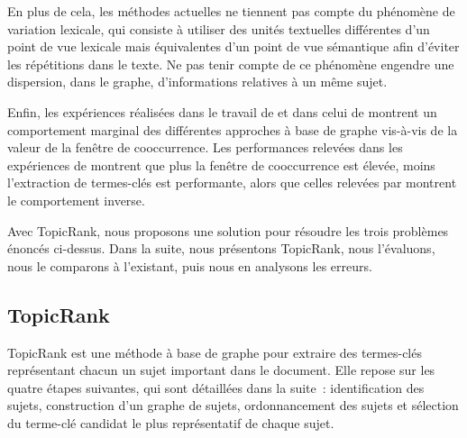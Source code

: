     En plus de cela, les méthodes actuelles ne tiennent pas compte du phénomène
    de variation lexicale, qui consiste à utiliser des unités textuelles
    différentes d'un point de vue lexicale mais équivalentes d'un point de vue
    sémantique afin d'éviter les répétitions dans le texte. Ne pas tenir compte
    de ce phénomène engendre une dispersion, dans le graphe, d'informations
    relatives à un même sujet.
    
    Enfin, les expériences réalisées dans le travail de
     et dans celui de 
    montrent un comportement marginal des différentes approches à base de graphe
    vis-à-vis de la valeur de la fenêtre de cooccurrence. Les performances
    relevées dans les expériences de  montrent que
    plus la fenêtre de cooccurrence est élevée, moins l'extraction de
    termes-clés est performante, alors que celles relevées par
     montrent le comportement inverse. 

    Avec TopicRank, nous proposons une solution pour résoudre les trois
    problèmes énoncés ci-dessus. Dans la suite, nous présentons TopicRank, nous
    l'évaluons, nous le comparons à l'existant, puis nous en analysons les
    erreurs.

    \subsection{TopicRank}
    \label{subsec:main:domain_independent_keyphrase_extraction-unsupervised_automatic_keyphrase_extraction-topicrank}
      TopicRank est une méthode à base de graphe pour extraire des termes-clés
      représentant chacun un sujet important dans le document.
      Elle repose sur les quatre étapes suivantes, qui sont détaillées dans
      la suite~: identification des sujets, construction d'un graphe de sujets,
      ordonnancement des sujets et sélection du terme-clé candidat le plus
      représentatif de chaque sujet.

